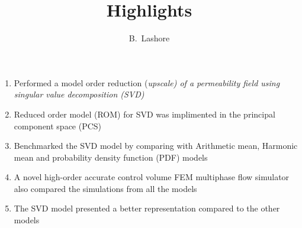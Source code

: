 \documentclass[a4paper,11pt]{article}
\author{B.~Lashore}
\title{Highlights}
\begin{document}
\maketitle

\begin{enumerate}
  \item Performed a model order reduction (\it upscale) of a permeability field using singular value decomposition (SVD)
  \item Reduced order model (ROM) for SVD was implimented in the principal component space (PCS)
  \item Benchmarked the SVD model by comparing with Arithmetic mean, Harmonic mean and probability density function (PDF) models
  \item A novel high-order accurate control volume FEM multiphase flow simulator also compared the simulations from all the models
  \item The SVD model presented a better representation compared to the other models 
\end{enumerate}
\end{document}
